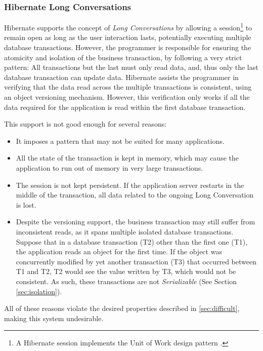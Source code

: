 \documentclass{llncs}
\begin{document}
\subsubsection{Hibernate Long Conversations}

Hibernate supports the concept of {\it Long Conversations} by allowing
a session\footnote{A Hibernate session implements the Unit of Work
  design pattern \cite{fowler2003patterns}.} to remain open as long as
the user interaction lasts, potentially executing multiple database
transactions. However, the programmer is responsible for ensuring the
atomicity and isolation of the business transaction, by following a
very strict pattern: All transactions but the last must only read
data, and, thus only the last database transaction can update
data. Hibernate assists the programmer in verifying that the data read
across the multiple transactions is consistent, using an object
versioning mechanism. However, this verification only works if all the
data required for the application is read within the first database
transaction.

This support is not good enough for several reasons:

\begin{itemize}
\item It imposes a pattern that may not be suited for many
  applications.
\item All the state of the transaction is kept in memory, which may
  cause the application to run out of memory in very large
  transactions.
\item The session is not kept persistent. If the application server
  restarts in the middle of the transaction, all data related to the
  ongoing Long Conversation is lost.
\item Despite the versioning support, the business transaction may
  still suffer from inconsistent reads, as it spans multiple isolated
  database transactions. Suppose that in a database transaction (T2)
  other than the first one (T1), the application reads an object for
  the first time. If the object was concurrently modified by yet
  another transaction (T3) that occurred between T1 and T2, T2 would
  see the value written by T3, which would not be consistent. As such,
  these transactions are not {\it Serializable} (See Section \ref{sec:isolation}).
\end{itemize}

All of these reasons violate the desired properties described in
\ref{sec:difficult}, making this system undesirable.
\end{document}
